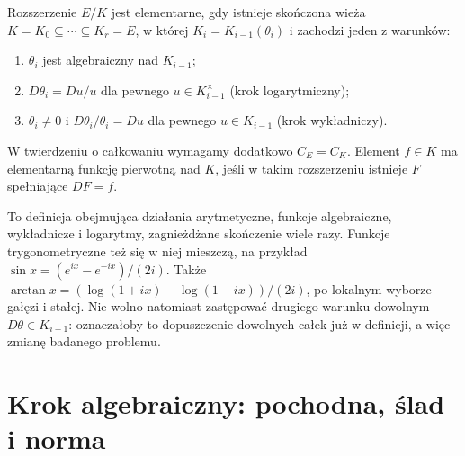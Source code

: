 \begin{definicja}
Rozszerzenie $E/K$ jest elementarne, gdy istnieje skończona wieża $K=K_0\subseteq\cdots\subseteq K_r=E$, w której $K_i=K_{i-1}(\theta_i)$ i zachodzi jeden z warunków:
\begin{enumerate}
\item $\theta_i$ jest algebraiczny nad $K_{i-1}$;
\item $D\theta_i=Du/u$ dla pewnego $u\in K_{i-1}^\times$ (krok logarytmiczny);
\item $\theta_i\ne0$ i $D\theta_i/\theta_i=Du$ dla pewnego $u\in K_{i-1}$ (krok wykładniczy).
\end{enumerate}
W twierdzeniu o całkowaniu wymagamy dodatkowo $C_E=C_K$. Element $f\in K$ ma elementarną funkcję pierwotną nad $K$, jeśli w takim rozszerzeniu istnieje $F$ spełniające $DF=f$.
\end{definicja}

To definicja obejmująca działania arytmetyczne, funkcje algebraiczne, wykładnicze i logarytmy, zagnieżdżane skończenie wiele razy. Funkcje trygonometryczne też się w niej mieszczą, na przykład $\sin x=(e^{ix}-e^{-ix})/(2i)$. Także $\arctan x=(\log(1+ix)-\log(1-ix))/(2i)$, po lokalnym wyborze gałęzi i stałej. Nie wolno natomiast zastępować drugiego warunku dowolnym $D\theta\in K_{i-1}$: oznaczałoby to dopuszczenie dowolnych całek już w definicji, a więc zmianę badanego problemu.

\section{Krok algebraiczny: pochodna, ślad i norma}

